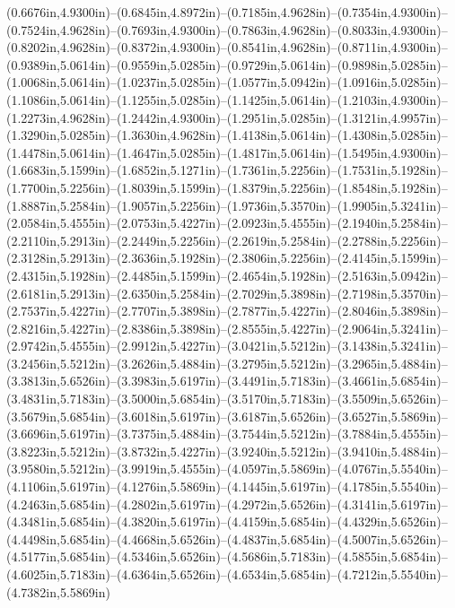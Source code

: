 (0.6676in,4.9300in)--(0.6845in,4.8972in)--(0.7185in,4.9628in)--(0.7354in,4.9300in)--(0.7524in,4.9628in)--(0.7693in,4.9300in)--(0.7863in,4.9628in)--(0.8033in,4.9300in)--(0.8202in,4.9628in)--(0.8372in,4.9300in)--(0.8541in,4.9628in)--(0.8711in,4.9300in)--(0.9389in,5.0614in)--(0.9559in,5.0285in)--(0.9729in,5.0614in)--(0.9898in,5.0285in)--(1.0068in,5.0614in)--(1.0237in,5.0285in)--(1.0577in,5.0942in)--(1.0916in,5.0285in)--(1.1086in,5.0614in)--(1.1255in,5.0285in)--(1.1425in,5.0614in)--(1.2103in,4.9300in)--(1.2273in,4.9628in)--(1.2442in,4.9300in)--(1.2951in,5.0285in)--(1.3121in,4.9957in)--(1.3290in,5.0285in)--(1.3630in,4.9628in)--(1.4138in,5.0614in)--(1.4308in,5.0285in)--(1.4478in,5.0614in)--(1.4647in,5.0285in)--(1.4817in,5.0614in)--(1.5495in,4.9300in)--(1.6683in,5.1599in)--(1.6852in,5.1271in)--(1.7361in,5.2256in)--(1.7531in,5.1928in)--(1.7700in,5.2256in)--(1.8039in,5.1599in)--(1.8379in,5.2256in)--(1.8548in,5.1928in)--(1.8887in,5.2584in)--(1.9057in,5.2256in)--(1.9736in,5.3570in)--(1.9905in,5.3241in)--(2.0584in,5.4555in)--(2.0753in,5.4227in)--(2.0923in,5.4555in)--(2.1940in,5.2584in)--(2.2110in,5.2913in)--(2.2449in,5.2256in)--(2.2619in,5.2584in)--(2.2788in,5.2256in)--(2.3128in,5.2913in)--(2.3636in,5.1928in)--(2.3806in,5.2256in)--(2.4145in,5.1599in)--(2.4315in,5.1928in)--(2.4485in,5.1599in)--(2.4654in,5.1928in)--(2.5163in,5.0942in)--(2.6181in,5.2913in)--(2.6350in,5.2584in)--(2.7029in,5.3898in)--(2.7198in,5.3570in)--(2.7537in,5.4227in)--(2.7707in,5.3898in)--(2.7877in,5.4227in)--(2.8046in,5.3898in)--(2.8216in,5.4227in)--(2.8386in,5.3898in)--(2.8555in,5.4227in)--(2.9064in,5.3241in)--(2.9742in,5.4555in)--(2.9912in,5.4227in)--(3.0421in,5.5212in)--(3.1438in,5.3241in)--(3.2456in,5.5212in)--(3.2626in,5.4884in)--(3.2795in,5.5212in)--(3.2965in,5.4884in)--(3.3813in,5.6526in)--(3.3983in,5.6197in)--(3.4491in,5.7183in)--(3.4661in,5.6854in)--(3.4831in,5.7183in)--(3.5000in,5.6854in)--(3.5170in,5.7183in)--(3.5509in,5.6526in)--(3.5679in,5.6854in)--(3.6018in,5.6197in)--(3.6187in,5.6526in)--(3.6527in,5.5869in)--(3.6696in,5.6197in)--(3.7375in,5.4884in)--(3.7544in,5.5212in)--(3.7884in,5.4555in)--(3.8223in,5.5212in)--(3.8732in,5.4227in)--(3.9240in,5.5212in)--(3.9410in,5.4884in)--(3.9580in,5.5212in)--(3.9919in,5.4555in)--(4.0597in,5.5869in)--(4.0767in,5.5540in)--(4.1106in,5.6197in)--(4.1276in,5.5869in)--(4.1445in,5.6197in)--(4.1785in,5.5540in)--(4.2463in,5.6854in)--(4.2802in,5.6197in)--(4.2972in,5.6526in)--(4.3141in,5.6197in)--(4.3481in,5.6854in)--(4.3820in,5.6197in)--(4.4159in,5.6854in)--(4.4329in,5.6526in)--(4.4498in,5.6854in)--(4.4668in,5.6526in)--(4.4837in,5.6854in)--(4.5007in,5.6526in)--(4.5177in,5.6854in)--(4.5346in,5.6526in)--(4.5686in,5.7183in)--(4.5855in,5.6854in)--(4.6025in,5.7183in)--(4.6364in,5.6526in)--(4.6534in,5.6854in)--(4.7212in,5.5540in)--(4.7382in,5.5869in) 